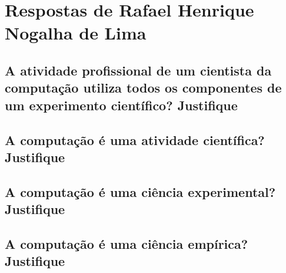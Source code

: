 \section{Respostas de Rafael Henrique Nogalha de Lima\label{tarefa-rafaelnogalha-componentes-eperimento}}

\subsection{A atividade profissional de um cientista da computação utiliza todos os componentes de um experimento científico? Justifique}

\subsection{A computação é uma atividade científica? Justifique}

\subsection{A computação é uma ciência experimental? Justifique}

\subsection{A computação é uma ciência empírica? Justifique}
